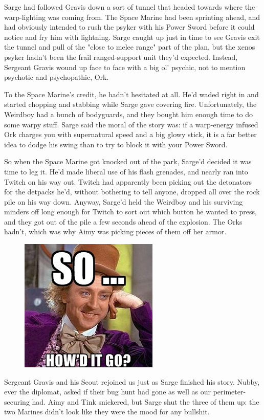 Sarge had followed Gravis down a sort of tunnel that headed towards where the warp-lighting was coming from. 
The Space Marine had been sprinting ahead, and had obviously intended to rush the psyker with his Power Sword before it could notice and fry him with lightning. 
Sarge caught up just in time to see Gravis exit the tunnel and pull of the "close to melee range" part of the plan, but the xenos psyker hadn't been the frail ranged-support unit they'd expected. 
Instead, Sergeant Gravis wound up face to face with a big ol' psychic, not to mention psychotic and psychopathic, Ork.

To the Space Marine's credit, he hadn't hesitated at all. 
He'd waded right in and started chopping and stabbing while Sarge gave covering fire. 
Unfortunately, the Weirdboy had a bunch of bodyguards, and they bought him enough time to do some warpy stuff. 
Sarge said the moral of the story was: 
if a warp-energy infused Ork charges you with supernatural speed and a big glowy stick, it is a far better idea to dodge his swing than to try to block it with your Power Sword.

So when the Space Marine got knocked out of the park, Sarge'd decided it was time to leg it. 
He'd made liberal use of his flash grenades, and nearly ran into Twitch on his way out. 
Twitch had apparently been picking out the detonators for the detpacks he'd, without bothering to tell anyone, dropped all over the rock pile on his way down. 
Anyway, Sarge'd held the Weirdboy and his surviving minders off long enough for Twitch to sort out which button he wanted to press, and they got out of the pile a few seconds ahead of the explosion. 
The Orks hadn't, which was why Aimy was picking pieces of them off her armor.

\begin{figure}
	\begin{center}
		\includegraphics[width=\figwidth]{pics/12/40.png}
	\end{center}
\end{figure}
Sergeant Gravis and his Scout rejoined us just as Sarge finished his story. 
Nubby, ever the diplomat, asked if their bug hunt had gone as well as our perimeter-securing had. 
Aimy and Tink snickered, but Sarge shut the three of them up: 
the two Marines didn't look like they were the mood for any bullshit.


